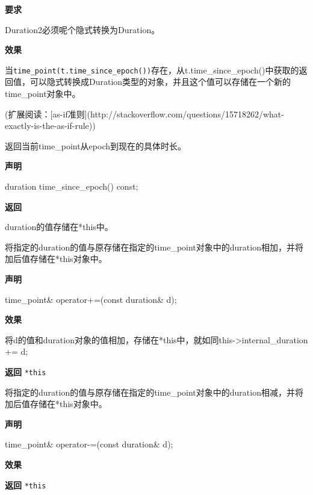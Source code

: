 \textbf{要求}

Duration2必须呢个隐式转换为Duration。

\textbf{效果}

当\texttt{time\_point(t.time\_since\_epoch())}存在，从t.time\_since\_epoch()中获取的返回值，可以隐式转换成Duration类型的对象，并且这个值可以存储在一个新的time\_point对象中。

(扩展阅读：[as-if准则](http://stackoverflow.com/questions/15718262/what-exactly-is-the-as-if-rule))


返回当前time\_point从epoch到现在的具体时长。

\textbf{声明}

\begin{cpp}
duration time_since_epoch() const;
\end{cpp}

\textbf{返回}

duration的值存储在*this中。


将指定的duration的值与原存储在指定的time\_point对象中的duration相加，并将加后值存储在*this对象中。

\textbf{声明}

\begin{cpp}
time_point& operator+=(const duration& d);
\end{cpp}

\textbf{效果}

将d的值和duration对象的值相加，存储在*this中，就如同this->internal\_duration += d;

\textbf{返回}
\texttt{*this}


将指定的duration的值与原存储在指定的time\_point对象中的duration相减，并将加后值存储在*this对象中。

\textbf{声明}

\begin{cpp}
time_point& operator-=(const duration& d);
\end{cpp}

\textbf{效果}


\textbf{返回}
\texttt{*this}


